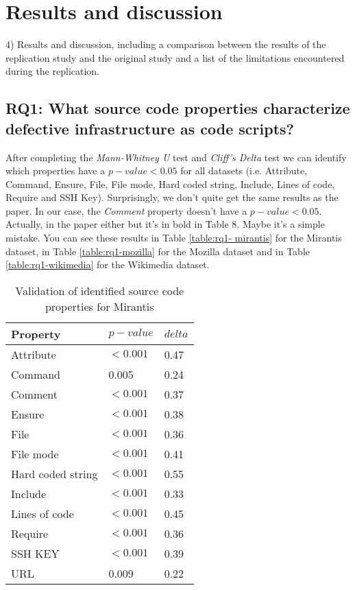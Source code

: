 
\section{Results and discussion}
\label{sec:results}
4) Results and discussion, including a comparison between the results of the 
replication study and the original study and a list of the limitations 
encountered during the replication.
\subsection{RQ1: What source code properties characterize defective 
infrastructure as code scripts?}
After completing the \emph{Mann-Whitney U} test and \emph{Cliff's Delta} test
we can identify which properties have a $p-value < 0.05$ for all datasets (i.e. 
Attribute, Command, Ensure, File, File mode, Hard coded string, Include, Lines 
of code, Require and SSH Key). Surprisingly, we don't quite get the same results 
as the paper. In our case, the \emph{Comment} property doesn't have a $p-value < 0.05$.
Actually, in the paper either but it's in bold in Table 8. 
Maybe it's a simple mistake. You can see these results in Table \ref{table:rq1-
mirantis} for the Mirantis dataset, in Table \ref{table:rq1-mozilla} for the 
Mozilla dataset and in Table \ref{table:rq1-wikimedia} for the Wikimedia dataset.


\begin{table}[h]
    \caption{Validation of identified source code properties for Mirantis}
    \label{table:rq1-mirantis}
    \centering
    \begin{tabular}{|l|l|l|}
    \hline
        Property & $p-value$ & $delta$ \\ \hline
        Attribute & $<0.001$ & 0.47 \\ \hline
        Command & 0.005 & 0.24 \\ \hline
        Comment & $<0.001$ & 0.37 \\ \hline
        Ensure & $<0.001$ & 0.38 \\ \hline
        File & $<0.001$ & 0.36 \\ \hline
        File mode & $<0.001$ & 0.41 \\ \hline
        Hard coded string & $<0.001$ & 0.55 \\ \hline
        Include & $<0.001$ & 0.33 \\ \hline
        Lines of code & $<0.001$ & 0.45 \\ \hline
        Require & $<0.001$ & 0.36 \\ \hline
        SSH KEY & $<0.001$ & 0.39 \\ \hline
        URL & 0.009 & 0.22 \\ \hline
    \end{tabular}
\end{table}

